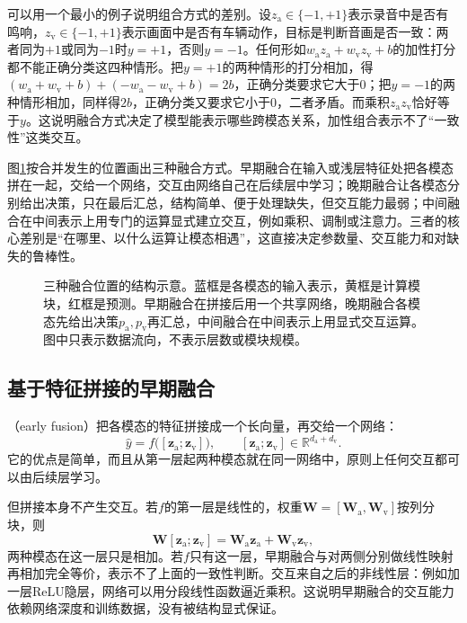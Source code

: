 可以用一个最小的例子说明组合方式的差别。设$z_{\mathrm a}\in\{-1,+1\}$表示录音中是否有鸣响，$z_{\mathrm v}\in\{-1,+1\}$表示画面中是否有车辆动作，目标是判断音画是否一致：两者同为$+1$或同为$-1$时$y=+1$，否则$y=-1$。任何形如$w_{\mathrm a}z_{\mathrm a}+w_{\mathrm v}z_{\mathrm v}+b$的加性打分都不能正确分类这四种情形。把$y=+1$的两种情形的打分相加，得$(w_{\mathrm a}+w_{\mathrm v}+b)+(-w_{\mathrm a}-w_{\mathrm v}+b)=2b$，正确分类要求它大于0；把$y=-1$的两种情形相加，同样得$2b$，正确分类又要求它小于0，二者矛盾。而乘积$z_{\mathrm a}z_{\mathrm v}$恰好等于$y$。这说明融合方式决定了模型能表示哪些跨模态关系，加性组合表示不了“一致性”这类交互。

图\ref{fig:vision-alignment-fusion}按合并发生的位置画出三种融合方式。早期融合在输入或浅层特征处把各模态拼在一起，交给一个网络，交互由网络自己在后续层中学习；晚期融合让各模态分别给出决策，只在最后汇总，结构简单、便于处理缺失，但交互能力最弱；中间融合在中间表示上用专门的运算显式建立交互，例如乘积、调制或注意力。三者的核心差别是“在哪里、以什么运算让模态相遇”，这直接决定参数量、交互能力和对缺失的鲁棒性。

\begin{figure}[tbp]
  \centering
  
  \caption{三种融合位置的结构示意。蓝框是各模态的输入表示，黄框是计算模块，红框是预测。早期融合在拼接后用一个共享网络，晚期融合各模态先给出决策$p_{\mathrm a},p_{\mathrm v}$再汇总，中间融合在中间表示上用显式交互运算。图中只表示数据流向，不表示层数或模块规模。}
  \label{fig:vision-alignment-fusion}
\end{figure}

\subsection{基于特征拼接的早期融合}
\label{sec:vision-alignment-early-fusion}

（early fusion）把各模态的特征拼接成一个长向量，再交给一个网络：
\begin{equation}
  \hat y=f\bigl([\bm z_{\mathrm a};\bm z_{\mathrm v}]\bigr),
  \qquad [\bm z_{\mathrm a};\bm z_{\mathrm v}]\in\mathbb R^{d_{\mathrm a}+d_{\mathrm v}}.
  \label{eq:vision-alignment-early}
\end{equation}
它的优点是简单，而且从第一层起两种模态就在同一网络中，原则上任何交互都可以由后续层学习。

但拼接本身不产生交互。若$f$的第一层是线性的，权重$\bm W=[\bm W_{\mathrm a},\bm W_{\mathrm v}]$按列分块，则
\[
  \bm W[\bm z_{\mathrm a};\bm z_{\mathrm v}]=\bm W_{\mathrm a}\bm z_{\mathrm a}+\bm W_{\mathrm v}\bm z_{\mathrm v},
\]
两种模态在这一层只是相加。若$f$只有这一层，早期融合与对两侧分别做线性映射再相加完全等价，表示不了上面的一致性判断。交互来自之后的非线性层：例如加一层ReLU隐层，网络可以用分段线性函数逼近乘积。这说明早期融合的交互能力依赖网络深度和训练数据，没有被结构显式保证。

